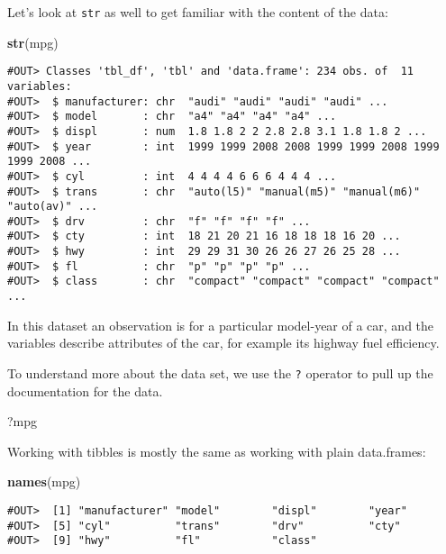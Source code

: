 \documentclass[]{book}
\newenvironment{Shaded}{\begin{snugshade}}{\end{snugshade}}
\newcommand{\KeywordTok}[1]{\textcolor[rgb]{0.13,0.29,0.53}{\textbf{#1}}}
\newcommand{\NormalTok}[1]{#1}
\begin{document}
Let's look at \texttt{str} as well to get familiar with the content of
the data:

\begin{Shaded}
\begin{Highlighting}[]
\KeywordTok{str}\NormalTok{(mpg)}
\end{Highlighting}
\end{Shaded}

\begin{verbatim}
#OUT> Classes 'tbl_df', 'tbl' and 'data.frame': 234 obs. of  11 variables:
#OUT>  $ manufacturer: chr  "audi" "audi" "audi" "audi" ...
#OUT>  $ model       : chr  "a4" "a4" "a4" "a4" ...
#OUT>  $ displ       : num  1.8 1.8 2 2 2.8 2.8 3.1 1.8 1.8 2 ...
#OUT>  $ year        : int  1999 1999 2008 2008 1999 1999 2008 1999 1999 2008 ...
#OUT>  $ cyl         : int  4 4 4 4 6 6 6 4 4 4 ...
#OUT>  $ trans       : chr  "auto(l5)" "manual(m5)" "manual(m6)" "auto(av)" ...
#OUT>  $ drv         : chr  "f" "f" "f" "f" ...
#OUT>  $ cty         : int  18 21 20 21 16 18 18 18 16 20 ...
#OUT>  $ hwy         : int  29 29 31 30 26 26 27 26 25 28 ...
#OUT>  $ fl          : chr  "p" "p" "p" "p" ...
#OUT>  $ class       : chr  "compact" "compact" "compact" "compact" ...
\end{verbatim}

In this dataset an observation is for a particular model-year of a car,
and the variables describe attributes of the car, for example its
highway fuel efficiency.

To understand more about the data set, we use the \texttt{?} operator to
pull up the documentation for the data.

\begin{Shaded}
\begin{Highlighting}[]
\NormalTok{?mpg}
\end{Highlighting}
\end{Shaded}

Working with tibbles is mostly the same as working with plain
data.frames:

\begin{Shaded}
\begin{Highlighting}[]
\KeywordTok{names}\NormalTok{(mpg)}
\end{Highlighting}
\end{Shaded}

\begin{verbatim}
#OUT>  [1] "manufacturer" "model"        "displ"        "year"        
#OUT>  [5] "cyl"          "trans"        "drv"          "cty"         
#OUT>  [9] "hwy"          "fl"           "class"
\end{verbatim}
\end{document}
